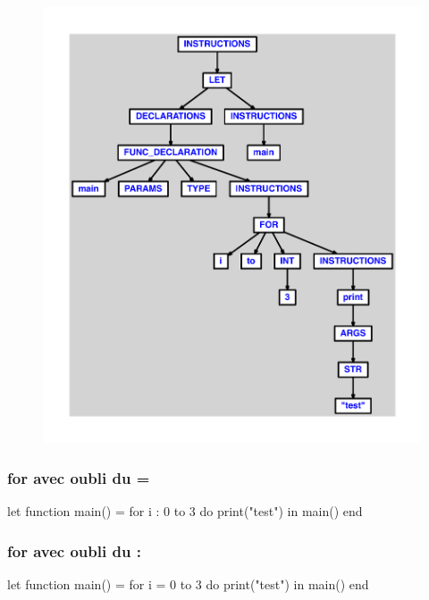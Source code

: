 \documentclass{article}
\begin{document}
\begin{figure}[H]\centering\includegraphics[max width=\textwidth]{ast/ast_192.pdf}\end{figure}\subsubsection{for avec oubli du =}
\begin{verbatimtab}
let
	function main() =
		for i : 0 to 3 do
			print("test")
in main() end
\end{verbatimtab}
\subsubsection{for avec oubli du :}
\begin{verbatimtab}
let
	function main() =
		for i = 0 to 3 do
			print("test")
in main() end
\end{verbatimtab}
\end{document}
